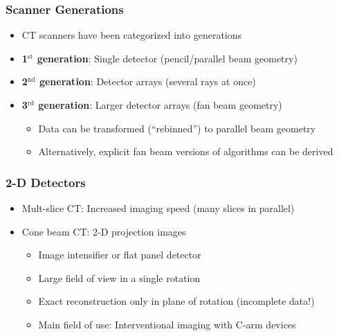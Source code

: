 \begin{frame}
	\frametitle{Scanner Generations}

	\begin{itemize}
		\setlength\itemsep{0.3cm}
		\item CT scanners have been categorized into generations
		\item \textbf{\textcolor{faublue}{1$^\text{st}$ generation}}: Single detector (pencil/parallel beam geometry)
		\item \textbf{\textcolor{faublue}{2$^\text{nd}$ generation}}: Detector arrays (several rays at once)
		\item \textbf{\textcolor{faublue}{3$^\text{rd}$ generation}}: Larger detector arrays (fan beam geometry)
		      \begin{itemize}
			      \item Data can be transformed (``rebinned'') to parallel beam geometry
			      \item Alternatively, explicit fan beam versions of algorithms can be derived
		      \end{itemize}

	\end{itemize}

\end{frame}

\begin{frame}
	\frametitle{2-D Detectors}

	\begin{itemize}
		\setlength\itemsep{0.3cm}
		\item Mult-slice CT: Increased imaging speed (many slices in parallel)
		\item Cone beam CT: 2-D projection images

		      \begin{itemize}
			      \setlength\itemsep{0.1cm}
			      \item Image intensifier or flat panel detector
			      \item Large field of view in a single rotation
			      \item Exact reconstruction only in plane of rotation (incomplete data!)
			      \item Main field of use: Interventional imaging with C-arm devices
		      \end{itemize}

	\end{itemize}

\end{frame}

